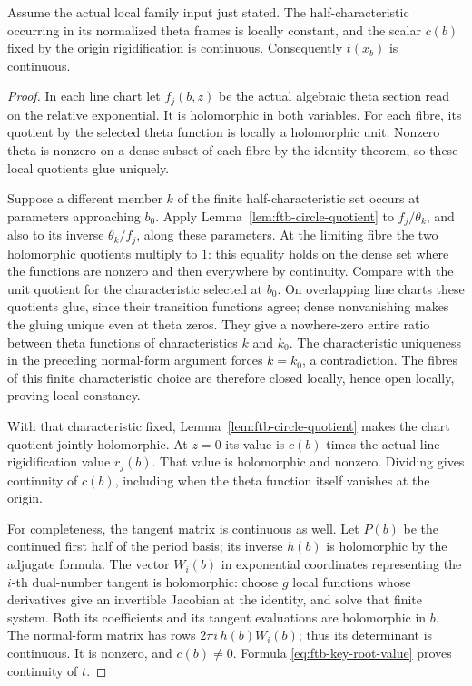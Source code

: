 \begin{srlemma}
\label{lem:ftb-finite-frame-continuity}
Assume the actual local family input just stated.
The half-characteristic occurring in its normalized theta frames
is locally constant, and the scalar \(c(b)\) fixed by the
origin rigidification is continuous.
Consequently \(t(x_b)\) is continuous.
\end{srlemma}
\begin{proof}
In each line chart let \(f_j(b,z)\) be the actual algebraic
theta section read on the relative exponential.
It is holomorphic in both variables.
For each fibre, its quotient by the selected theta function
is locally a holomorphic unit.  Nonzero theta is nonzero on
a dense subset of each fibre by the identity theorem, so
these local quotients glue uniquely.

Suppose a different member \(k\) of the finite
half-characteristic set occurs at parameters approaching
\(b_0\).  Apply Lemma~\ref{lem:ftb-circle-quotient} to
\(f_j/\theta_k\), and also to its inverse
\(\theta_k/f_j\), along these parameters.
At the limiting fibre the two holomorphic quotients multiply
to \(1\): this equality holds on the dense set where the
functions are nonzero and then everywhere by continuity.
Compare with the unit quotient for the characteristic selected
at \(b_0\).  On overlapping line charts these quotients glue,
since their transition functions agree; dense nonvanishing
makes the gluing unique even at theta zeros.
They give a nowhere-zero entire ratio between theta functions
of characteristics \(k\) and \(k_0\).
The characteristic uniqueness in the preceding normal-form
argument forces \(k=k_0\), a contradiction.
The fibres of this finite characteristic choice are therefore
closed locally, hence open locally, proving local constancy.

With that characteristic fixed,
Lemma~\ref{lem:ftb-circle-quotient} makes the chart quotient
jointly holomorphic.
At \(z=0\) its value is \(c(b)\) times the actual line
rigidification value \(r_j(b)\).
That value is holomorphic and nonzero.
Dividing gives continuity of \(c(b)\), including when the
theta function itself vanishes at the origin.

For completeness, the tangent matrix is continuous as well.
Let \(P(b)\) be the continued first half of the period basis;
its inverse \(h(b)\) is holomorphic by the adjugate formula.
The vector \(W_i(b)\) in exponential coordinates representing
the \(i\)-th dual-number tangent is holomorphic: choose
\(g\) local functions whose derivatives give an invertible
Jacobian at the identity, and solve that finite system.
Both its coefficients and its tangent evaluations are
holomorphic in \(b\).  The normal-form matrix has rows
\(2\pi i\,h(b)W_i(b)\); thus its determinant is continuous.
It is nonzero, and \(c(b)\ne0\).
Formula \eqref{eq:ftb-key-root-value} proves continuity of \(t\).
\end{proof}

